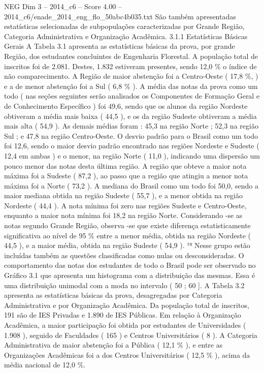 \begin{textsample}{NEG Dim 3 – 2014\_c6 – Score 4.00 – 2014\_c6/enade\_2014\_eng\_flo\_50abc4b035.txt}
São também apresentadas estatísticas selecionadas de subpopulações caracterizadas por Grande Região, Categoria Administrativa e Organização Acadêmica. 3.1.1 Estatísticas Básicas Gerais A Tabela 3.1 apresenta as estatísticas básicas da prova, por grande Região, dos estudantes concluintes de Engenharia Florestal.
A população total de inscritos foi de 2.081.
Destes, 1.832 estiveram presentes, sendo 12,0 \% o índice de não comparecimento.
A Região de maior abstenção foi a Centro-Oeste ( 17,8 \%, ) e a de menor abstenção foi a Sul ( 6,8 \% ).
A média das notas da prova como um todo ( nas seções seguintes serão analisados os Componentes de Formação Geral e de Conhecimento Específico ) foi 49,6, sendo que os alunos da região Nordeste obtiveram a média mais baixa ( 44,5 ), e os da região Sudeste obtiveram a média mais alta ( 54,9 ).
As demais médias foram : 45,3 na região Norte ; 52,3 na região Sul ; e 47,8 na região Centro-Oeste.
O desvio padrão para o Brasil como um todo foi 12,6, sendo o maior desvio padrão encontrado nas regiões Nordeste e Sudeste ( 12,4 em ambas ) e o menor, na região Norte ( 11,0 ), indicando uma dispersão um pouco menor das notas desta última região.
A região que obteve a maior nota máxima foi a Sudeste ( 87,2 ), ao passo que a região que atingiu a menor nota máxima foi a Norte ( 73,2 ).
A mediana do Brasil como um todo foi 50,0, sendo a maior mediana obtida na região Sudeste ( 55,7 ), e a menor obtida na região Nordeste ( 44,4 ).
A nota mínima foi zero nas regiões Sudeste e Centro-Oeste, enquanto a maior nota mínima foi 18,2 na região Norte.
Considerando -se as notas segundo Grande Região, observa -se que existe diferença estatisticamente significativa ao nível de 95 \% entre a menor média, obtida na região Nordeste ( 44,5 ), e a maior média, obtida na região Sudeste ( 54,9 ). ¹⁹ Nesse grupo estão incluídas também as questões classificadas como nulas ou desconsideradas.
O comportamento das notas dos estudantes de todo o Brasil pode ser observado no Gráfico 3.1 que apresenta um histograma com a distribuição das mesmas.
Essa é uma distribuição unimodal com a moda no intervalo ( 50 ; 60 ].
A Tabela 3.2 apresenta as estatísticas básicas da prova, desagregadas por Categoria Administrativa e por Organização Acadêmica.
Da população total de inscritos, 191 são de IES Privadas e 1.890 de IES Públicas.
Em relação à Organização Acadêmica, a maior participação foi obtida por estudantes de Universidades ( 1.908 ), seguido de Faculdades ( 165 ) e Centros Universitários ( 8 ).
A Categoria Administrativa de maior abstenção foi a Pública ( 12,1 \% ), e entre as Organizações Acadêmicas foi a dos Centros Universitários ( 12,5 \% ), acima da média nacional de 12,0 \%.

\end{textsample}
